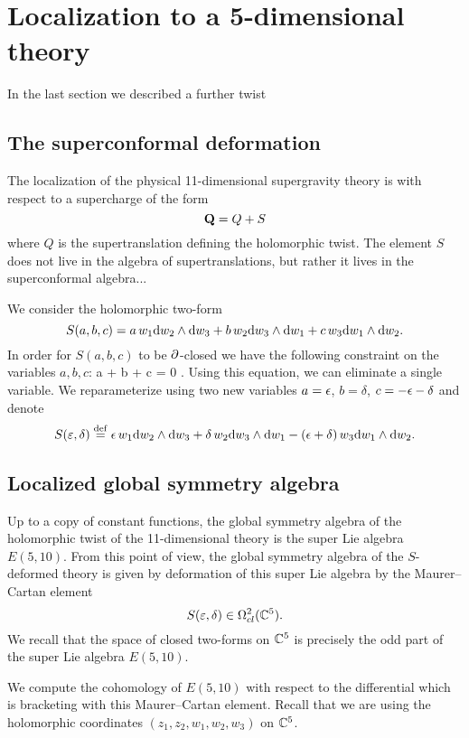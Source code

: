 \documentclass[11pt]{amsart}
\def\vep{\varepsilon}
\begin{document}
\section{Localization to a 5-dimensional theory} 

In the last section we described a further twist 

\subsection{The superconformal deformation}

The localization of the physical 11-dimensional supergravity theory is with respect to a supercharge of the form 
\[
{\bf Q} = Q + S 
\]
where $Q$ is the supertranslation defining the holomorphic twist. 
The element $S$ does not live in the algebra of supertranslations, but rather it lives in the superconformal algebra...

We consider the holomorphic two-form
\[
S(a,b,c) = a \, w_1 {\rm d} w_2 \wedge {\rm d} w_3 + b \, w_2 {\rm d} w_3 \wedge {\rm d} w_1 + c \, w_3 {\rm d} w_1 \wedge {\rm d} w_2 .
\]
In order for $S(a,b,c)$ to be $\partial$-closed we have the following constraint on the variables $a,b,c$:
\beqn\label{eqn:abc}
a + b + c = 0 .
\eeqn
Using this equation, we can eliminate a single variable. 
We reparameterize using two new variables $a = \epsilon$, $b=\delta$, $c = -\epsilon - \delta$ and denote
\[
S(\vep, \delta) \define \ep \, w_1 \d w_2 \wedge \d w_3 + \delta \, w_2 \d w_3 \wedge \d w_1 - (\ep + \delta) \, w_3 \d w_1 \wedge \d w_2 .
\]

\subsection{Localized global symmetry algebra}

Up to a copy of constant functions, the global symmetry algebra of the holomorphic twist of the 11-dimensional theory is the super Lie algebra $E(5,10)$.
From this point of view, the global symmetry algebra of the $S$-deformed theory is given by deformation of this super Lie algebra by the Maurer--Cartan element 
\[
S(\vep, \delta) \in \Omega^{2}_{cl}(\CC^5) .
\]
We recall that the space of closed two-forms on $\mathbb C^5$ is precisely the odd part of the super Lie algebra $E(5,10)$. 

We compute the cohomology of $E(5,10)$ with respect to the differential which is bracketing with this Maurer--Cartan element. 
Recall that we are using the holomorphic coordinates $(z_1,z_2,w_1,w_2,w_3)$ on $\mathbb C^5$. 
\end{document}
